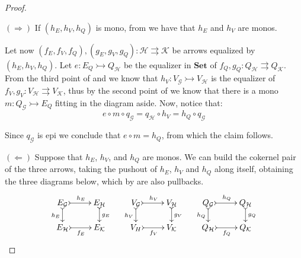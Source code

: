 \documentclass[3p]{elsarticle}
\newcommand{\Set}{\mathbf{Set}}
\newcommand{\mto}{\rightarrowtail}
\theoremstyle{remark}
\theoremstyle{definition}
\begin{document}
\begin{proof}\label{proof:regmono}

$(\Rightarrow)$	If $(h_E, h_V, h_Q)$ is mono, from  we have that $h_E$ and $h_V$ are monos.

\noindent
	\begin{minipage}[l]{.82\linewidth}	\setlength{\parindent}{1.5em}
	Let now $(f_E, f_V, f_Q), (g_E, g_V, g_Q): \mathcal{H\rightrightarrows K}$ be arrows equalized by $(h_E, h_V, h_Q)$. Let $e\colon E_Q\mto Q_{\mathcal{H}}$ be the equalizer in
$\Set$ of $f_Q, g_Q\colon Q_{\mathcal{H}}\rightrightarrows Q_{\mathcal{K}}$. From the third point of  and  we know that $h_V\colon V_{\mathcal{G}}\mto V_{\mathcal{H}} $ 
is the equalizer of $f_V, g_V\colon V_{\mathcal{H}}\rightrightarrows V_{\mathcal{K}}$, thus by the second point of  we know that there is a mono 
$m\colon Q_{\mathcal{G}}\mto E_Q$ fitting in the diagram aside. Now, notice that: 
\vspace{-.2cm}
\[e\circ m\circ q_{\mathcal{G}}=q_\mathcal{H}\circ h_V=h_{Q}\circ q_{\mathcal{G}}\]
	\end{minipage}
	\hfill
	\begin{minipage}[r]{.2\linewidth}
	\end{minipage} 
	
	\smallskip  
Since $q_{\mathcal{G}}$ is epi we conclude that $e\circ m=h_Q$, from which the claim follows.	


	$(\Leftarrow)$ Suppose that $h_E$, $h_V$, and $h_Q$  are monos. 
	We can build the cokernel pair of the three arrows, taking the pushout of $h_E$, $h_V$ and $h_Q$ along itself, obtaining the three diagrams below, which by  are also pullbacks.
	\[     \xymatrix@R=15pt{
	E_\mathcal{G} \ar@{>->}[d]_{h_E} \ar@{>->}[r]^{h_E}&E_\mathcal{H} \ar@{>->}[d]^{g_E} &	V_\mathcal{G} \ar@{>->}[d]_{h_V} \ar@{>->}[r]^{h_V}& V_\mathcal{H} \ar@{>->}[d]^{g_V} &Q_\mathcal{G} \ar@{>->}[d]_{h_Q} \ar@{>->}[r]^{h_Q}& Q_\mathcal{H} \ar@{>->}[d]^{g_Q} \\
		E_\mathcal{H} \ar@{>->}[r]_{f_E} & E_\mathcal{{K}} & V_H \ar@{>->}[r]_{f_V} & V_\mathcal{{K}} & Q_\mathcal{H} \ar@{>->}[r]_{f_Q} & Q_\mathcal{{K}}
	}
	\]   
	

\end{proof}
\end{document}
